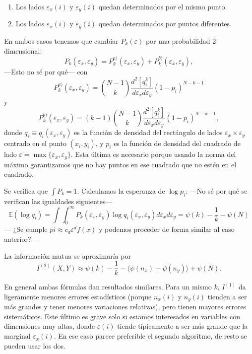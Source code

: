 \documentclass[10pt,a4paper]{article} %
\theoremstyle{definition}
\begin{document}
\begin{enumerate}[label={\alph*)}]
\item Los lados $\varepsilon_x(i)$ y $\varepsilon_y(i)$ quedan determinados por el mismo punto.
\item Los lados $\varepsilon_x(i)$ y $\varepsilon_y(i)$ quedan determinados por puntos diferentes.
\end{enumerate}

En ambos casos tenemos que cambiar $P_k(\varepsilon)$ por una probabilidad 2-dimensional:\[
P_k(\varepsilon_x, \varepsilon_y) = P_k^{a)}(\varepsilon_x, \varepsilon_y) + P_k^{b)}(\varepsilon_x, \varepsilon_y),
\]
---Esto no sé por qué---
con \[
P_k^{a)}(\varepsilon_x, \varepsilon_y) = \binom{N-1}{k} \frac{d^2[q_i^k]}{d\varepsilon_x d \varepsilon_y}(1-p_i)^{N-k-1}
\]
y\[
P_k^{b)}(\varepsilon_x, \varepsilon_y) = (k-1)\binom{N-1}{k} \frac{d^2[q_i^k]}{d\varepsilon_x d \varepsilon_y}(1-p_i)^{N-k-1},
\]
donde $q_i \equiv q_i(\varepsilon_x, \varepsilon_y)$ es la función de densidad del rectángulo de lados $\varepsilon_x \times \varepsilon_y$ centrado en el punto $(x_i, y_i)$, y $p_i$ es la función de densidad del cuadrado de lado $\varepsilon = \max \{\varepsilon_x, \varepsilon_y\}$. Esta última es necesario porque usando la norma del máximo garantizamos que no hay puntos en ese cuadrado que no estén en el cuadrado.

Se verifica que $\int P_k =1$. Calculamos la esperanza de $\log p_i$:
---No sé por qué se verifican las igualdades siguientes---
\[
\mathbb{E}(\log q_i) = \int \int_0^{\infty} P_k(\varepsilon_x, \varepsilon_y) \log q_i(\varepsilon_x, \varepsilon_y) d \varepsilon_x d\varepsilon_y
= \psi(k) - \frac{1}{k} - \psi(N)
\]
--- ¿Se cumple $pi\approx c_d\varepsilon^df(x)$ y podemos proceder de forma similar al caso anterior?---

La información mutua se aproximaría por\[
I^{(2)}(X,Y) \approx \psi(k) - \frac{1}{k} - \langle \psi(n_x) + \psi(n_y) \rangle + \psi(N).
\]


En general ambas fórmulas dan resultados similares. Para un mismo $k$, $I^{(1)}$ da ligeramente menores errores estadísticos (porque $n_x(i)$ y $n_y(i)$ tienden a ser más grandes y tener menores variaciones relativas), pero tienen mayores errores sistemáticos. Este último es grave solo si estamos interesados en variables con dimensiones muy altas, donde $\varepsilon(i)$ tiende típicamente a ser más grande que la marginal $\varepsilon_x(i)$. En ese caso parece preferible el segundo algoritmo, de resto se pueden usar los dos.
\end{document}
